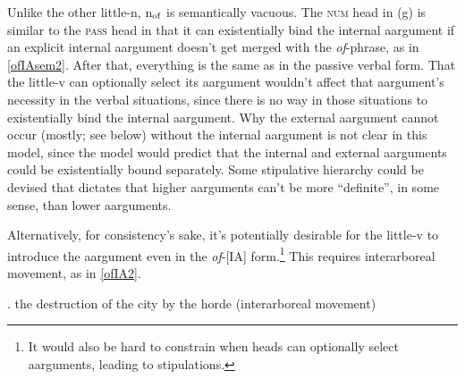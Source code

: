 \documentclass[12pt]{article}
\newcommand*{\textsub}[1]{\ensuremath{_\textrm{{\scriptsize #1}}}}
\begin{document}
\doublespacing

Unlike the other little-n, n\textsub{of} is semantically vacuous. The \textsc{num} head in (g) is similar to the \textsc{pass} head in that it can existentially bind the internal aargument if an explicit internal aargument doesn't get merged with the \textit{of}-phrase, as in \ref{ofIAsem2}. After that, everything is the same as in the passive verbal form. That the little-v can optionally select its aargument wouldn't affect that aargument's necessity in the verbal situations, since there is no way in those situations to existentially bind the internal aargument. Why the external aargument cannot occur (mostly; see below) without the internal aargument is not clear in this model, since the model would predict that the internal and external aarguments could be existentially bound separately. Some stipulative hierarchy could be devised that dictates that higher aarguments can't be more ``definite'', in some sense, than lower aarguments.

Alternatively, for consistency's sake, it's potentially desirable for the little-v to introduce the aargument even in the \textit{of}-[IA] form.\footnote{ It would also be hard to constrain when heads can optionally select aarguments, leading to stipulations.} This requires interarboreal movement, as in \ref{ofIA2}.

\singlespacing

\ex. \label{ofIA2} the destruction of the city by the horde (interarboreal movement)
\end{document}
